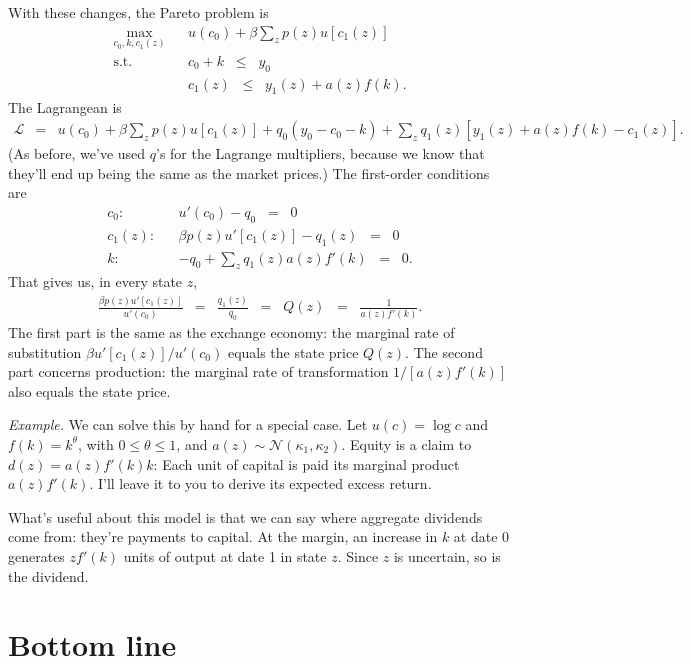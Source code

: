 \documentclass[11pt]{article}
\begin{document}
With these changes, the Pareto problem is
\begin{eqnarray*}
    \max_{c_0,k, c_1(z)} && u(c_0) + \beta \sum_z p(z) u[c_1(z)] \\
    \mbox{s.t.}   &&  c_0  + k \;\;\leq\;\; y_0 \\
                  &&  c_1(z) \;\;\leq\;\; y_1(z) + a(z) f(k) .
\end{eqnarray*}
The Lagrangean is
\begin{eqnarray*}
    \mathcal{L} &=&  u(c_0) + \beta \sum_z p(z) u[c_1(z)] + q_0 (y_0 - c_0 - k)
                    + \sum_z q_1(z)  [ y_1(z) + a(z) f(k) - c_1(z)]  .
\end{eqnarray*}
(As before, we've used $q$'s for the Lagrange multipliers,
because we know that they'll end up being the same as the market prices.)
The first-order conditions are
\begin{eqnarray*}
    c_0: &&  u'(c_0) - q_0 \;\;=\;\; 0 \\
    c_1(z): &&  \beta p(z) u'[c_1(z)] - q_1(z) \;\;=\;\; 0 \\
     k:   && - q_0 + \sum_z q_1(z) a(z) f'(k) \;\;=\;\; 0 .
\end{eqnarray*}
That gives us, in every state $z$,
\begin{eqnarray*}
    \frac{\beta p(z) u'[c_1(z)]}{u'(c_0)} &=& \frac{q_1(z)}{q_0}
    \;\;=\;\; Q(z)
    \;\;=\;\; \frac{1}{a(z) f'(k)} .
\end{eqnarray*}
The first part is the same as the exchange economy:
the marginal rate of substitution $\beta u'[c_1(z)]/u'(c_0)$
equals the state price $Q(z)$.
The second part concerns production:
the marginal rate of transformation $ 1 / [a(z) f'(k)]$ also equals the state price.

{\it Example.\/}
We can solve this by hand for a special case.
Let $u(c) = \log c$ and $f(k) = k^\theta$, with
$0 \leq \theta \leq 1$,
and $a(z) \sim \mathcal{N}(\kappa_1,\kappa_2)$.
Equity is a claim to $d(z) = a(z) f'(k) k$:
Each unit of capital is paid its marginal product $a(z) f'(k)$.
I'll leave it to you to derive its expected excess return.


What's useful about this model is that we can say where
aggregate dividends come from:
they're payments to capital.
At the margin,
an increase in $k$ at date 0 generates $z f'(k)$ units of
output at date 1 in state $z$.
Since $z$ is uncertain, so is the dividend.


\section*{Bottom line}
\end{document}
